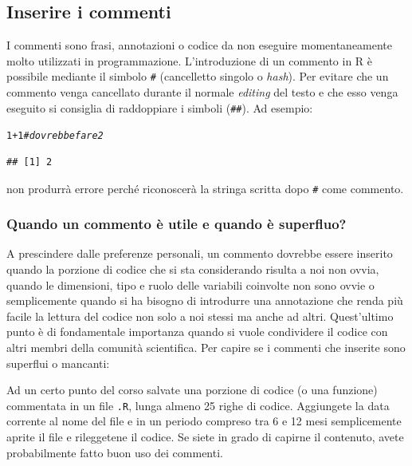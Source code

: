 \documentclass[onecolumn,11pt]{book}\usepackage[]{graphicx}\usepackage[]{color}
\makeatletter
\newcommand{\hlnum}[1]{\textcolor[rgb]{0.686,0.059,0.569}{#1}}%
\newcommand{\hlcom}[1]{\textcolor[rgb]{0.678,0.584,0.686}{\textit{#1}}}%
\newcommand{\hlopt}[1]{\textcolor[rgb]{0,0,0}{#1}}%
\newenvironment{kframe}{%
 \def\at@end@of@kframe{}%
 \ifinner\ifhmode%
  \def\at@end@of@kframe{\end{minipage}}%
  \begin{minipage}{\columnwidth}%
 \fi\fi%
 \def\FrameCommand##1{\hskip\@totalleftmargin \hskip-\fboxsep
 \colorbox{shadecolor}{##1}\hskip-\fboxsep
     \hskip-\linewidth \hskip-\@totalleftmargin \hskip\columnwidth}%
 \MakeFramed {\advance\hsize-\width
   \@totalleftmargin\z@ \linewidth\hsize
   \@setminipage}}%
 {\par\unskip\endMakeFramed%
 \at@end@of@kframe}
\newenvironment{knitrout}{}{} %
\makeatother
\begin{document}
\subsection*{Inserire i commenti}
I commenti sono frasi, annotazioni o codice da non eseguire momentaneamente molto utilizzati in programmazione. L'introduzione di un commento in \textsf{R} \`e possibile mediante il simbolo \texttt{\#} (cancelletto singolo o \emph{hash}). Per evitare che un commento venga cancellato durante il normale \textit{editing} del testo e che esso venga eseguito si consiglia di raddoppiare i simboli (\texttt{\#\#}). Ad esempio:
\index{\texttt{\#}}
\begin{knitrout}
\color{fgcolor}\begin{kframe}
\begin{alltt}
\hlnum{1}\hlopt{+}\hlnum{1} \hlcom{# dovrebbe fare 2}
\end{alltt}
\begin{verbatim}
## [1] 2
\end{verbatim}
\end{kframe}
\end{knitrout}
non produrr\`a errore perch\'e riconoscer\`a la stringa scritta dopo \texttt{\#} come commento.

\subsubsection{Quando un commento \`e utile e quando \`e superfluo?}
A prescindere dalle preferenze personali, un commento dovrebbe essere inserito quando la porzione di codice che si sta considerando risulta a noi non ovvia, quando le dimensioni, tipo e ruolo delle variabili coinvolte non sono ovvie o semplicemente quando si ha bisogno di introdurre una annotazione che renda pi\`u facile la lettura del codice non solo a noi stessi ma anche ad altri. Quest'ultimo punto \`e di fondamentale importanza quando si vuole condividere il codice con altri membri della comunit\`a scientifica. Per capire se i commenti che inserite sono superflui o mancanti:
\begin{shaded}
Ad un certo punto del corso salvate una porzione di codice (o una funzione) commentata in un file \texttt{.R}, lunga almeno 25 righe di codice. Aggiungete la data corrente al nome del file e in un periodo compreso tra 6 e 12 mesi semplicemente aprite il file e rileggetene il codice. Se siete in grado di capirne il contenuto, avete probabilmente fatto buon uso dei commenti.
 \end{shaded}
\end{document}
